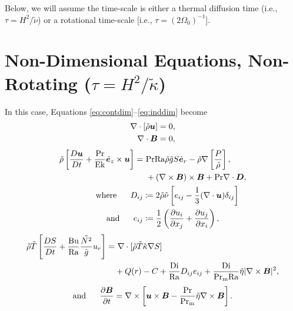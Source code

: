\documentclass[12pt]{article}
\numberwithin{equation}{section}
\begin{document}
	Below, we will assume the time-scale is either a thermal diffusion time (i.e., $\tau=H^2/\tilde{\nu}$) or a rotational time-scale [i.e., $\tau=(2\Omega_0)^{-1}$]. %
	
	\section{Non-Dimensional Equations, Non-Rotating ($\tau=H^2/\tilde{\kappa}$)}
	In this case, Equations \eqref{eq:contdim}--\eqref{eq:inddim} become 
	\begin{align}
	\nabla\cdot[\tilde{\rho}\bm{u}] &= 0\label{eq:contndvisc},\\
	\nabla\cdot \bm{B} &= 0,
\end{align}
\begin{subequations}\label{eq:momndvisc}
	\begin{align}
		\tilde{\rho}\left[\frac{D\bm{u}}{Dt}+\frac{{\rm{Pr}}}{{\rm{Ek}}}\hat{\bm{e}}_z\times\bm{u}\right] = &\ {\rm{Pr}}{\rm{Ra}}\tilde{\rho}\tilde{g} S\hat{\bm{e}}_r         -\tilde{\rho}\nabla\left[ \frac{P}{\tilde{\rho}} \right], \nonumber\\
		&\ +(\nabla\times\bm{B})\times\bm{B} +{\rm{Pr}}\nabla\cdot\bm{D},\\
		\text{where}\ \ \ \ \  D_{ij} &\coloneqq 2\tilde{\rho}\tilde{\nu} \left[e_{ij} - \frac{1}{3}(\nabla\cdot\bm{u}) \delta_{ij} \right]\\
		\text{and}\ \ \ \ \  e_{ij} &\coloneqq \frac{1}{2}\left(\frac{\partial u_i}{\partial x_j} + \frac{\partial u_j}{\partial x_i} \right),
	\end{align}
\end{subequations}
\begin{align}\label{eq:enndvisc}
	\rhotilde\tmptilde\left[ \matderiv{S} + \frac{\bu}{\ra}\frac{\nsqtilde}{\gtilde} u_r\right]  = &\ \Div[\rhotilde \tmptilde \kappatilde \nabla S] \nonumber \\
	&+ Q(r) -C + \frac{\di}{\ra} D_{ij}e_{ij} + \frac{\di}{\prm\ra} \etatilde|\curl\vecb|^2,
\end{align}
\begin{align}\label{eq:indndvisc}
	\text{and}\ \ \ \ \  \frac{\partial\bm{B}}{\partial t} = \nabla\times\left[\bm{u}\times\bm{B} - \frac{{\rm{Pr}}}{{\rm{Pr_m}}}\tilde{\eta}\nabla\times\bm{B}\right].
\end{align}	
\end{document}
